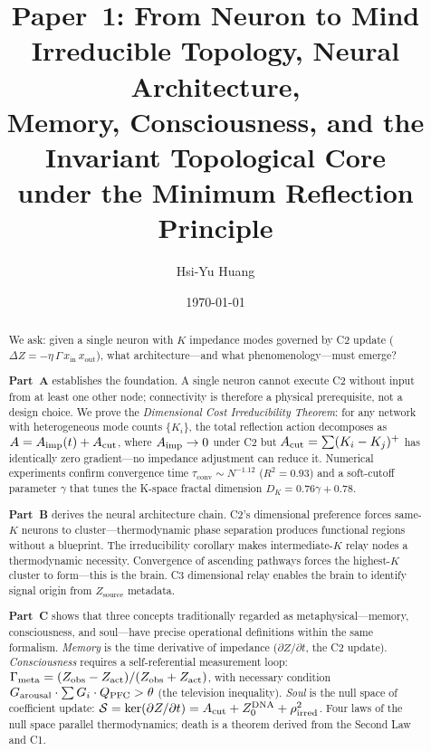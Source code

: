 \documentclass[aps,pre,twocolumn,superscriptaddress,floatfix]{revtex4-2}
\begin{document}
\title{%
Paper~1: From Neuron to Mind\\[2pt]
Irreducible Topology, Neural Architecture,\\
Memory, Consciousness, and the Invariant Topological Core\\[4pt]
\large under the Minimum Reflection Principle%
}

\author{Hsi-Yu Huang}

\date{\today}

\begin{abstract}
We ask: given a single neuron with $K$ impedance modes
governed by C2 update
($\Delta Z = -\eta\,\Gamma\,x_{\text{in}}\,x_{\text{out}}$),
what architecture---and what phenomenology---must emerge?

\textbf{Part~A} establishes the foundation.
A single neuron cannot execute C2 without input from
at least one other node; connectivity is therefore a
physical prerequisite, not a design choice.
We prove the \emph{Dimensional Cost Irreducibility
Theorem}: for any network with heterogeneous mode counts
$\{K_i\}$, the total reflection action decomposes as
$A = A_{\text{imp}}(t) + A_{\text{cut}}$,
where $A_{\text{imp}} \to 0$ under C2 but
$A_{\text{cut}} = \sum (K_i - K_j)^+$ has identically zero
gradient---no impedance adjustment can reduce it.
Numerical experiments confirm convergence time
$\tau_{\text{conv}} \sim N^{-1.12}$ ($R^2 = 0.93$)
and a soft-cutoff parameter $\gamma$ that tunes the
K-space fractal dimension
$D_K = 0.76\gamma + 0.78$.

\textbf{Part~B} derives the neural architecture chain.
C2's dimensional preference forces same-$K$ neurons
to cluster---thermodynamic phase separation produces
functional regions without a blueprint.
The irreducibility corollary makes intermediate-$K$
relay nodes a thermodynamic necessity.
Convergence of ascending pathways forces the
highest-$K$ cluster to form---this is the brain.
C3 dimensional relay enables the brain to
identify signal origin from $Z_{\text{source}}$ metadata.

\textbf{Part~C} shows that three concepts traditionally
regarded as metaphysical---memory, consciousness, and
soul---have precise operational definitions within
the same formalism.
\emph{Memory} is the time derivative of impedance
($\partial Z/\partial t$, the C2 update).
\emph{Consciousness} requires a self-referential
measurement loop:
$\Gamma_{\text{meta}}=(Z_{\text{obs}}-Z_{\text{act}})/(Z_{\text{obs}}+Z_{\text{act}})$,
with necessary condition
$G_{\text{arousal}}\cdot\sum G_i\cdot Q_{\text{PFC}}>\theta$
(the television inequality).
\emph{Soul} is the null space of coefficient update:
$\mathcal{S}=\ker(\partial Z/\partial t)
=A_{\text{cut}} + Z_0^{\text{DNA}} + \rho_{\text{irred}}^2$.
Four laws of the null space parallel thermodynamics;
death is a theorem derived from the Second Law and C1.


\end{abstract}
\end{document}
